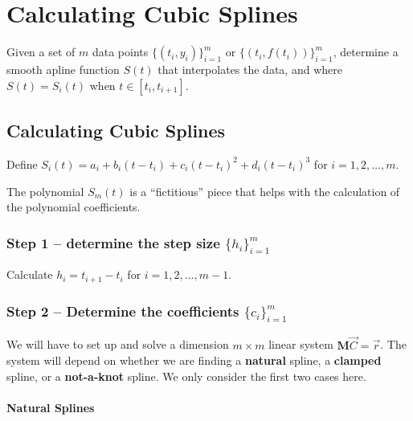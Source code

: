 \chapter*{Calculating Cubic Splines}

\begin{remark}[Problem]
    Given a set of \( m \) data points \( \{ (t_i, y_i) \}_{i=1}^{m} \) or \( \{ (t_i, f(t_i)) \}_{i=1}^{m} \), determine a smooth apline function \( S(t) \) that interpolates the data, and where \( S(t) = S_i(t) \) when \( t \in [t_i, t_{i+1}] \).
\end{remark}

\section*{Calculating Cubic Splines}

Define \( S_i(t) = a_i + b_i(t - t_i) + c_i(t - t_i)^2 + d_i(t - t_i)^3 \) for \( i = 1, 2, \dots, m \).

\begin{note}
    The polynomial \( S_m(t) \) is a ``fictitious'' piece that helps with the calculation of the polynomial coefficients.
\end{note}

\subsection*{Step 1 -- determine the step size \( \{ h_i \}_{i=1}^{m} \)}

Calculate \( h_i = t_{i + 1} - t_i \) for \( i = 1, 2, \dots, m - 1 \).

\subsection*{Step 2 -- Determine the coefficients \( \{ c_i \}_{i=1}^{m} \)}

We will have to set up and solve a dimension \( m \times m \) linear system \( \mathbf{M}\vec{C} = \vec{r} \). The system will depend on whether we are finding a \textbf{natural} spline, a \textbf{clamped} spline, or a \textbf{not-a-knot} spline. We only consider the first two cases here.

\subsubsection{Natural Splines}


